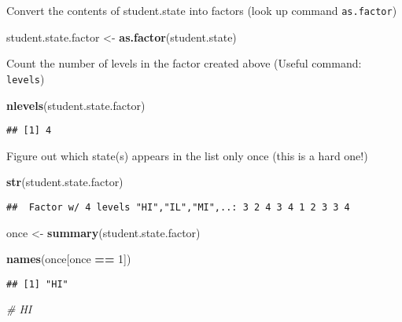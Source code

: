 \documentclass[]{article}
\newenvironment{Shaded}{\begin{snugshade}}{\end{snugshade}}
\newcommand{\KeywordTok}[1]{\textcolor[rgb]{0.13,0.29,0.53}{\textbf{#1}}}
\newcommand{\DecValTok}[1]{\textcolor[rgb]{0.00,0.00,0.81}{#1}}
\newcommand{\StringTok}[1]{\textcolor[rgb]{0.31,0.60,0.02}{#1}}
\newcommand{\CommentTok}[1]{\textcolor[rgb]{0.56,0.35,0.01}{\textit{#1}}}
\newcommand{\OperatorTok}[1]{\textcolor[rgb]{0.81,0.36,0.00}{\textbf{#1}}}
\newcommand{\NormalTok}[1]{#1}
\begin{document}
Convert the contents of student.state into factors (look up command
\texttt{as.factor})

\begin{Shaded}
\begin{Highlighting}[]
\NormalTok{student.state.factor <-}\StringTok{ }\KeywordTok{as.factor}\NormalTok{(student.state)}
\end{Highlighting}
\end{Shaded}

Count the number of levels in the factor created above (Useful command:
\texttt{levels})

\begin{Shaded}
\begin{Highlighting}[]
\KeywordTok{nlevels}\NormalTok{(student.state.factor)}
\end{Highlighting}
\end{Shaded}

\begin{verbatim}
## [1] 4
\end{verbatim}

Figure out which state(s) appears in the list only once (this is a hard
one!)

\begin{Shaded}
\begin{Highlighting}[]
\KeywordTok{str}\NormalTok{(student.state.factor)}
\end{Highlighting}
\end{Shaded}

\begin{verbatim}
##  Factor w/ 4 levels "HI","IL","MI",..: 3 2 4 3 4 1 2 3 3 4
\end{verbatim}

\begin{Shaded}
\begin{Highlighting}[]
\NormalTok{once <-}\StringTok{ }\KeywordTok{summary}\NormalTok{(student.state.factor)}

\KeywordTok{names}\NormalTok{(once[once }\OperatorTok{==}\StringTok{ }\DecValTok{1}\NormalTok{])}
\end{Highlighting}
\end{Shaded}

\begin{verbatim}
## [1] "HI"
\end{verbatim}

\begin{Shaded}
\begin{Highlighting}[]
\CommentTok{# HI}
\end{Highlighting}
\end{Shaded}
\end{document}
